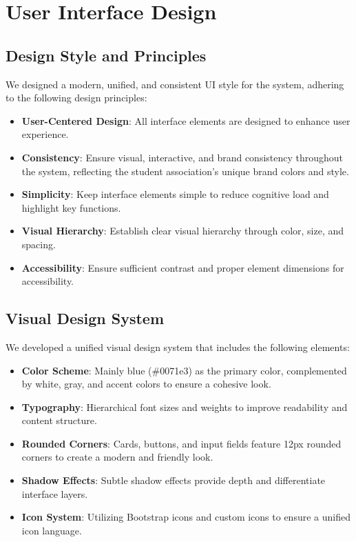 \section{User Interface Design}

\subsection{Design Style and Principles}
We designed a modern, unified, and consistent UI style for the system, adhering to the following design principles:
\begin{itemize}
    \item \textbf{User-Centered Design}: All interface elements are designed to enhance user experience.
    \item \textbf{Consistency}: Ensure visual, interactive, and brand consistency throughout the system, reflecting the student association's unique brand colors and style.
    \item \textbf{Simplicity}: Keep interface elements simple to reduce cognitive load and highlight key functions.
    \item \textbf{Visual Hierarchy}: Establish clear visual hierarchy through color, size, and spacing.
    \item \textbf{Accessibility}: Ensure sufficient contrast and proper element dimensions for accessibility.
\end{itemize}

\subsection{Visual Design System}
We developed a unified visual design system that includes the following elements:
\begin{itemize}
    \item \textbf{Color Scheme}: Mainly blue (\#0071e3) as the primary color, complemented by white, gray, and accent colors to ensure a cohesive look.
    \item \textbf{Typography}: Hierarchical font sizes and weights to improve readability and content structure.
    \item \textbf{Rounded Corners}: Cards, buttons, and input fields feature 12px rounded corners to create a modern and friendly look.
    \item \textbf{Shadow Effects}: Subtle shadow effects provide depth and differentiate interface layers.
    \item \textbf{Icon System}: Utilizing Bootstrap icons and custom icons to ensure a unified icon language.
\end{itemize}

